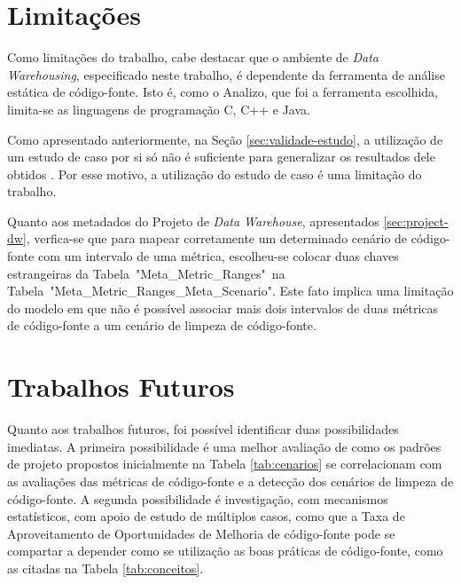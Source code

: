 \section{Limitações}

Como limitações do trabalho, cabe destacar que o ambiente de \textit{Data Warehousing}, especificado neste trabalho, é dependente da ferramenta de análise estática de código-fonte. Isto é, como o Analizo, que foi a ferramenta escolhida, limita-se as linguagens de programação C, C++ e Java.

Como apresentado anteriormente, na Seção \ref{sec:validade-estudo}, a utilização de um estudo de caso por si só não é suficiente para generalizar os resultados dele obtidos \cite{yin2011applications}. Por esse motivo, a utilização do estudo de caso é uma limitação do trabalho.

Quanto aos metadados do Projeto de \textit{Data Warehouse}, apresentados \ref{sec:project-dw}, verfica-se que para mapear corretamente um determinado cenário de código-fonte com um intervalo de uma métrica, escolheu-se colocar duas chaves estrangeiras da Tabela~"Meta\_Metric\_Ranges"~na Tabela~"Meta\_Metric\_Ranges\_Meta\_Scenario". Este fato implica uma limitação do modelo em que não é possível associar mais dois intervalos de  duas métricas de código-fonte a um cenário de limpeza de código-fonte.  


\section{Trabalhos Futuros}

Quanto aos trabalhos futuros, foi possível identificar duas possibilidades imediatas. A primeira possibilidade é uma melhor avaliação de como os padrões de projeto propostos inicialmente na Tabela \ref{tab:cenarios} se correlacionam com as avaliações das métricas de código-fonte e a detecção dos cenários de limpeza de código-fonte. A segunda possibilidade é investigação, com mecanismos estatísticos, com apoio de estudo de múltiplos casos, como que a Taxa de Aproveitamento de Oportunidades de Melhoria de código-fonte pode se compartar a depender como se utilização as boas práticas de código-fonte, como as citadas na Tabela \ref{tab:conceitos}.